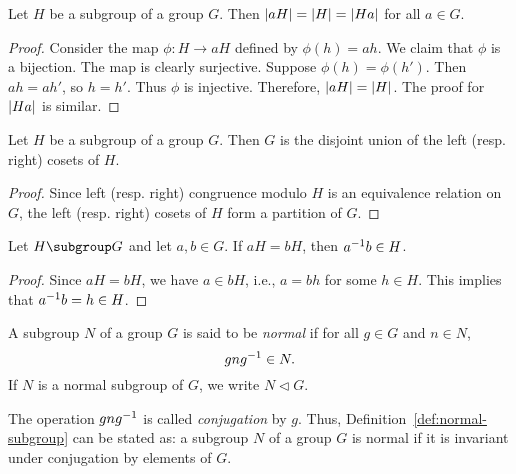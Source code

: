 \begin{theorem}
    Let \(H\) be a subgroup of a group \(G\). Then \(\lvert aH \rvert = \lvert H \rvert =
    \lvert Ha \rvert\) for all \(a \in G\).
\end{theorem}

\begin{proof}
    Consider the map \(\phi: H \to aH\) defined by \(\phi(h) = ah\). We claim
    that \(\phi\) is a bijection. The map is clearly surjective. Suppose
    \(\phi(h) = \phi(h')\). Then \(ah = ah'\), so \(h = h'\). Thus \(\phi\) is
    injective. Therefore, \(\lvert aH \rvert = \lvert H \rvert\). The proof for
    \(\lvert Ha \rvert\) is similar.
\end{proof}

\begin{theorem}
    Let \(H\) be a subgroup of a group \(G\). Then \(G\) is the disjoint union
    of the left (resp. right) cosets of \(H\).
\end{theorem}

\begin{proof}
    Since left (resp. right) congruence modulo \(H\) is an equivalence relation
    on \(G\), the left (resp. right) cosets of \(H\) form a partition of \(G\).
\end{proof}

\begin{theorem}
    Let \(H \subgroup G\) and let \(a, b \in G\). If \(aH = bH\), then \(a^{-1} b
    \in H\).
\end{theorem}

\begin{proof}
    Since \(aH = bH\), we have \(a \in bH\), i.e., \(a = bh\) for some \(h \in
    H\). This implies that \(a^{-1} b = h \in H\).
\end{proof}

\begin{definition}
    \label{def:normal-subgroup}
    A subgroup \(N\) of a group \(G\) is said to be \emph{normal} if for all \(g
    \in G\) and \(n \in N\),
    \[
        gng^{-1} \in N.
    \]
    If \(N\) is a normal subgroup of \(G\), we write \(N \triangleleft G\).
\end{definition}

\begin{remark}
    The operation \(gng^{-1}\) is called \emph{conjugation} by \(g\). Thus,
    Definition~\ref{def:normal-subgroup} can be stated as: a subgroup \(N\) of a
    group \(G\) is normal if it is invariant under conjugation by elements of
    \(G\).
\end{remark}

